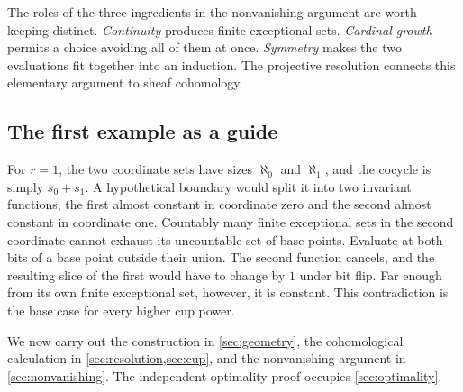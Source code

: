 The roles of the three ingredients in the nonvanishing argument are
worth keeping distinct. \emph{Continuity} produces finite exceptional
sets. \emph{Cardinal growth} permits a choice avoiding all of them at
once. \emph{Symmetry} makes the two evaluations fit together into an
induction. The projective resolution connects this elementary argument
to sheaf cohomology.

\subsection{The first example as a guide}

For \(r=1\), the two coordinate sets have sizes \(\aleph_0\) and
\(\aleph_1\), and the cocycle is simply \(s_0+s_1\). A hypothetical
boundary would split it into two invariant functions, the first
almost constant in coordinate zero and the second almost constant in
coordinate one. Countably many finite exceptional sets in the second
coordinate cannot exhaust its uncountable set of base points. Evaluate
at both bits of a base point outside their union. The second function
cancels, and the resulting slice of the first would have to change by \(1\)
under bit flip.
Far enough from its own finite exceptional set, however, it is constant.
This contradiction is the base case for every higher cup power.

We now carry out the construction in \cref{sec:geometry}, the
cohomological calculation in \cref{sec:resolution,sec:cup}, and the
nonvanishing argument in \cref{sec:nonvanishing}. The independent
optimality proof occupies \cref{sec:optimality}.
